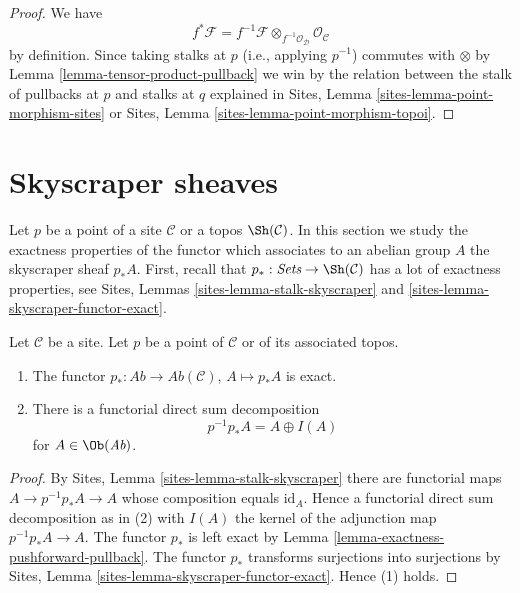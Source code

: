 \begin{proof}
We have
$$
f^*\mathcal{F} =
f^{-1}\mathcal{F} \otimes_{f^{-1}\mathcal{O}_\mathcal{D}}
\mathcal{O}_\mathcal{C}
$$
by definition. Since taking stalks at $p$ (i.e., applying
$p^{-1}$) commutes with $\otimes$ by
Lemma \ref{lemma-tensor-product-pullback}
we win by the relation between the stalk of pullbacks at $p$
and stalks at $q$ explained in
Sites, Lemma \ref{sites-lemma-point-morphism-sites} or
Sites, Lemma \ref{sites-lemma-point-morphism-topoi}.
\end{proof}






\section{Skyscraper sheaves}
\label{section-skyscraper}

\noindent
Let $p$ be a point of a site $\mathcal{C}$ or a topos
$\Sh(\mathcal{C})$. In this section we study the exactness
properties of the functor which associates to an abelian group $A$
the skyscraper sheaf $p_*A$. First, recall that
$p_* : \textit{Sets} \to \Sh(\mathcal{C})$ has a lot
of exactness properties, see
Sites, Lemmas \ref{sites-lemma-stalk-skyscraper} and
\ref{sites-lemma-skyscraper-functor-exact}.

\begin{lemma}
\label{lemma-skyscraper-exact}
Let $\mathcal{C}$ be a site. Let $p$ be a point of
$\mathcal{C}$ or of its associated topos.
\begin{enumerate}
\item The functor $p_* : \textit{Ab} \to \textit{Ab}(\mathcal{C})$,
$A \mapsto p_*A$ is exact.
\item There is a functorial direct sum decomposition
$$
p^{-1}p_*A = A \oplus I(A)
$$
for $A \in \Ob(\textit{Ab})$.
\end{enumerate}
\end{lemma}

\begin{proof}
By
Sites, Lemma \ref{sites-lemma-stalk-skyscraper}
there are functorial maps $A \to p^{-1}p_*A \to A$ whose composition
equals $\text{id}_A$. Hence a functorial direct sum decomposition
as in (2) with $I(A)$ the kernel of the adjunction map
$p^{-1}p_*A \to A$. The functor $p_*$ is left exact by
Lemma \ref{lemma-exactness-pushforward-pullback}.
The functor $p_*$ transforms surjections into surjections by
Sites, Lemma \ref{sites-lemma-skyscraper-functor-exact}.
Hence (1) holds.
\end{proof}

